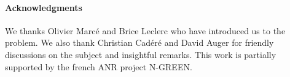 \documentclass[10pt, conference, letterpaper]{IEEEtran}
\begin{document}
  
 \paragraph*{Acknowledgments} 
 We thanks Olivier Marcé and Brice Leclerc who have introduced us to the problem.
 We also thank Christian Cad\'er\'e and David Auger for friendly discussions on the subject and insightful remarks. This work is partially supported by the french ANR project N-GREEN.



\end{document}
